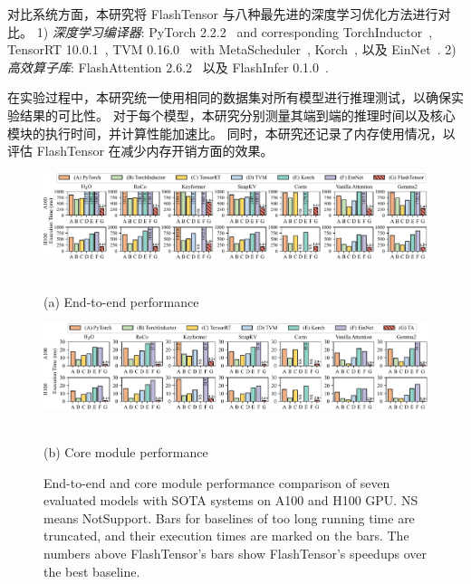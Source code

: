 对比系统方面，本研究将 FlashTensor 与八种最先进的深度学习优化方法进行对比。
1) \textit{深度学习编译器}: PyTorch 2.2.2~\cite{pytorch19} and corresponding TorchInductor~\cite{torchcompile}, TensorRT 10.0.1~\cite{tensorrt},  TVM 0.16.0~\cite{chen2018tvm} with MetaScheduler~\cite{chen2018autotvm, zheng2020ansor}, Korch~\cite{hu2024korch}, 以及 EinNet~\cite{zheng2023einnet}. 
2) \textit{高效算子库}: FlashAttention 2.6.2~\cite{dao2022flashattention, dao2023flashattention} 以及 FlashInfer 0.1.0~\cite{flashinfer}.

在实验过程中，本研究统一使用相同的数据集对所有模型进行推理测试，以确保实验结果的可比性。
对于每个模型，本研究分别测量其端到端的推理时间以及核心模块的执行时间，并计算性能加速比。
同时，本研究还记录了内存使用情况，以评估 FlashTensor 在减少内存开销方面的效果。

\begin{figure}[ht]
    \centering
    \begin{minipage}[ht]{\textwidth}
        {\includegraphics[width=\linewidth]{figures/flashtensor/e2e-crop.pdf}}
    \end{minipage}
    \\
    \centering \small (a) End-to-end performance
    \begin{minipage}[ht]{\textwidth}
        {\includegraphics[width=\linewidth]{figures/flashtensor/kernel-crop.pdf}}
    \end{minipage}
    \\
    \centering \small (b) Core module performance
    \caption{End-to-end and core module performance comparison of seven evaluated models with SOTA systems on A100 and H100 GPU. NS means NotSupport. Bars for baselines of too long running time are truncated, and their execution times are marked on the bars. The numbers above FlashTensor's bars show FlashTensor's speedups over the best baseline.}
    \label{fig:e2e-kernel}
\end{figure}

